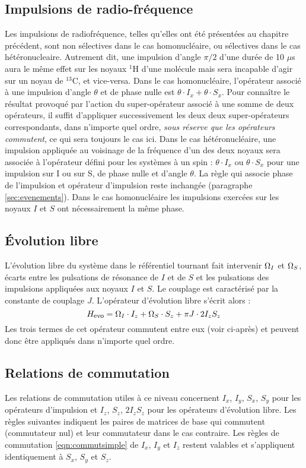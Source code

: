 \subsection{Impulsions de radio-fréquence}
Les impulsions de radiofréquence, telles qu'elles ont été présentées au chapitre précédent,
sont non sélectives dans le cas homonucléaire, ou sélectives dans 
le cas hétéronucleaire.
Autrement dit, une impulsion d'angle $\pi/2$ d'une durée de 10 $\mu$s aura le même
effet sur les noyaux $^1$H d'une molécule mais sera incapable d'agir
sur un noyau de $^{13}$C, et vice-versa.
Dans le cas homonucléaire, l'opérateur associé à une impulsion d'angle 
$\theta$ et de phase nulle est $\theta \cdot I_x + \theta \cdot S_x$. 
Pour connaître le résultat provoqué par l'action du super-opérateur associé à une
somme de deux opérateurs, il suffit d'appliquer successivement les deux 
deux super-opérateurs correspondants, dans n'importe quel ordre,
\emph{sous réserve que les opérateurs commutent}, ce qui sera toujours le cas ici.
Dans le cas hétéronucléaire, une impulsion appliquée au voisinage de la fréquence 
d'un des deux noyaux sera associée à l'opérateur défini pour les systèmes à un spin : 
$\theta \cdot I_x$ ou $\theta \cdot S_x$ pour une impulsion sur I 
ou sur S, de phase nulle et d'angle $\theta$.
La règle qui associe phase de l'impulsion et opérateur d'impulsion reste inchangée
(paragraphe \ref{sec:evenements}).
Dans le cas homonucléaire les impulsions exercées
sur les noyaux $I$ et $S$ ont nécessairement la même phase.

\subsection{Évolution libre}
L'évolution libre du système dans le référentiel tournant 
fait intervenir $\Omega_I$ et $\Omega_S$, écarts entre les pulsations de 
résonance de $I$ et de $S$ et les pulsations des impulsions appliquées aux noyaux $I$ et $S$. 
Le couplage est caractérisé par la constante de couplage $J$. 
L'opérateur d'évolution libre s'écrit alors :
\begin{equation}
\label{eqn:hcouplefaible}
H_{\mbox{\footnotesize evo}} = \Omega_I \cdot I_z + \Omega_S \cdot S_z + \pi J \cdot 2I_zS_z
\end{equation}
Les trois termes de cet opérateur commutent entre eux (voir ci-après) et peuvent donc
être appliqués dans n'importe quel ordre.
 
\subsection{Relations de commutation}
Les relations de commutation utiles à ce niveau concernent $I_x$, $I_y$, $S_x$, $S_y$ pour les 
opérateurs d'impulsion et $I_z$, $S_z$, $2I_zS_z$ pour les opérateurs d'évolution libre. 
Les règles suivantes indiquent les paires de matrices de base qui commutent (commutateur nul) et 
leur commutateur dans le cas contraire. Les règles de commutation \ref{eqn:commutsimple}
de $I_x$, $I_y$ et $I_z$ restent valables et s'appliquent identiquement
à $S_x$, $S_y$ et $S_z$.


